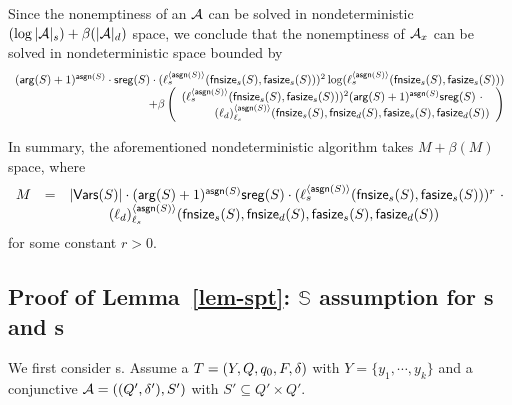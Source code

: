 Since the nonemptiness of an \SA{} $\mathcal{A}$ can be solved in nondeterministic $(\log |\mathcal{A}|_s) + \beta(|\mathcal{A}|_d)$ space, we conclude that the nonemptiness of $\mathcal{A}_x$ can be solved in nondeterministic space bounded by 
{\small
$$
\begin{array}{l}
(\rcdim(S)+1)^{\rcdep(S)} \cdot \rcsreg(S) \cdot (\ell_s^{\langle \rcdep(S) \rangle}(\rcphi_s(S), \rcpsi_s(S)))^2 \log (\ell^{\langle \rcdep(S) \rangle}_s(\rcphi_s(S), \rcpsi_s(S))) \\
\hfill +\beta
\left(
\begin{array}{l}
(\ell_s^{\langle \rcdep(S) \rangle}(\rcphi_s(S), \rcpsi_s(S)))^2 (\rcdim(S)+1)^{\rcdep(S)} \rcsreg(S)\ \cdot  \\
\hspace{1cm} (\ell_d)^{\langle  \rcdep(S) \rangle}_{\ell_s}(\rcphi_s(S),\rcphi_d(S),  \rcpsi_s(S), \rcpsi_d(S))
\end{array}
\right)
\end{array}
$$
}


In summary, the aforementioned nondeterministic algorithm takes  $M + \beta(M)$ space, where 
%
$$
\begin{array}{l c l}
M & = & |\mathsf{Vars}(S)| \cdot (\mathsf{arg}(S)+1)^{\mathsf{asgn}(S)}  \mathsf{sreg}(S) \cdot  (\ell_s^{\langle \mathsf{asgn}(S) \rangle}(\mathsf{fnsize}_s(S), \mathsf{fasize}_s(S)))^{r}\ \cdot \\
& &  \hspace{1cm} (\ell_d)^{\langle  \mathsf{asgn}(S) \rangle}_{\ell_s}(\mathsf{fnsize}_s(S),\mathsf{fnsize}_d(S),  \mathsf{fasize}_s(S), \mathsf{fasize}_d(S))
\end{array}
$$
%
for some constant $r > 0$.



\subsection{Proof of Lemma~\ref{lem-spt}: $\mathbb{S}$\prerec{} assumption for \SSPT{}s and \SPT{}s}

We first consider \SSPT{}s. Assume a \SSPT{} $T=(Y, Q, q_0, F, \delta)$ with $Y = \{y_1,\cdots, y_k\}$ and a conjunctive \SA{} $\mathcal{A} = ((Q', \delta'), S')$ with $S' \subseteq Q' \times Q'$. 

